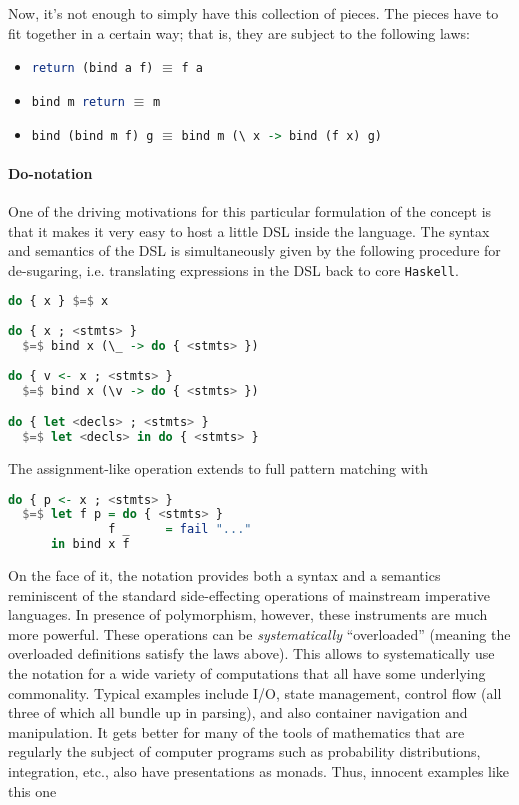 Now, it's not enough to simply have this collection of pieces. The
pieces have to fit together in a certain way; that is, they are
subject to the following laws:

\begin{itemize}
  \item \lstinline[language=Haskell]!return (bind a f)! $\equiv$ \lstinline[language=Haskell]!f a! %
  \item \lstinline[language=Haskell]!bind m return! $\equiv$ \lstinline[language=Haskell]!m! %
  \item \lstinline[language=Haskell]!bind (bind m f) g! $\equiv$ \lstinline[language=Haskell]!bind m (\ x -> bind (f x) g)! %
\end{itemize}

\paragraph{Do-notation}
One of the driving motivations for this particular formulation of the
concept is that it makes it very easy to host a little DSL inside the
language. The syntax and semantics of the DSL is simultaneously given
by the following procedure for de-sugaring, i.e. translating
expressions in the DSL back to core \texttt{Haskell}.

\begin{lstlisting}[language=Haskell,mathescape=true]
do { x } $=$ x
 
do { x ; <stmts> }
  $=$ bind x (\_ -> do { <stmts> })
 
do { v <- x ; <stmts> }
  $=$ bind x (\v -> do { <stmts> }) 

do { let <decls> ; <stmts> }
  $=$ let <decls> in do { <stmts> }
\end{lstlisting} 

The assignment-like operation extends to full pattern matching with

\begin{lstlisting}[language=Haskell,mathescape=true]
  do { p <- x ; <stmts> }
  $=$ let f p = do { <stmts> }
              f _     = fail "..."
      in bind x f
\end{lstlisting}

On the face of it, the notation provides both a syntax and a semantics
reminiscent of the standard side-effecting operations of mainstream
imperative languages. In presence of polymorphism, however, these
instruments are much more powerful. These operations can be
\emph{systematically} ``overloaded'' (meaning the overloaded
definitions satisfy the laws above). This allows to systematically use
the notation for a wide variety of computations that all have some
underlying commonality. Typical examples include I/O, state
management, control flow (all three of which all bundle up in
parsing), and also container navigation and manipulation. It gets
better for many of the tools of mathematics that are regularly the
subject of computer programs such as probability distributions,
integration, etc., also have presentations as monads. Thus, innocent
examples like this one

